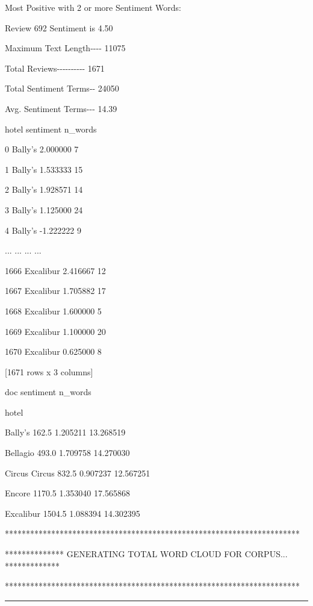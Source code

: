 \hfill\break

Most Positive with 2 or more Sentiment Words:

Review 692 Sentiment is 4.50

\hfill\break

Maximum Text Length-\/-\/-\/- 11075

Total Reviews-\/-\/-\/-\/-\/-\/-\/-\/-\/- 1671

Total Sentiment Terms-\/- 24050

Avg. Sentiment Terms-\/-\/- 14.39

\hfill\break

hotel sentiment n\_words

0 Bally's 2.000000 7

1 Bally's 1.533333 15

2 Bally's 1.928571 14

3 Bally's 1.125000 24

4 Bally's -1.222222 9

... ... ... ...

1666 Excalibur 2.416667 12

1667 Excalibur 1.705882 17

1668 Excalibur 1.600000 5

1669 Excalibur 1.100000 20

1670 Excalibur 0.625000 8

\hfill\break

{[}1671 rows x 3 columns{]}

\hfill\break

doc sentiment n\_words

hotel

Bally's 162.5 1.205211 13.268519

Bellagio 493.0 1.709758 14.270030

Circus Circus 832.5 0.907237 12.567251

Encore 1170.5 1.353040 17.565868

Excalibur 1504.5 1.088394 14.302395

\hfill\break

**********************************************************************

************** GENERATING TOTAL WORD CLOUD FOR CORPUS... *************

**********************************************************************

\hfill\break

\begin{center}\rule{0.5\linewidth}{0.5pt}\end{center}

